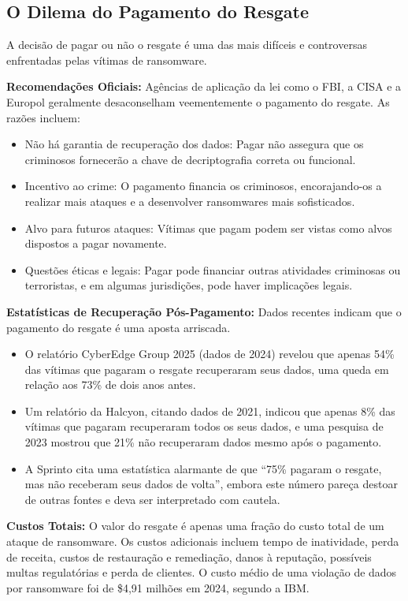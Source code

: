 \subsection{O Dilema do Pagamento do Resgate}
A decisão de pagar ou não o resgate é uma das mais difíceis e controversas enfrentadas pelas vítimas de ransomware.

\textbf{Recomendações Oficiais:} Agências de aplicação da lei como o FBI, a CISA e a Europol geralmente desaconselham veementemente o pagamento do resgate. As razões incluem:

\begin{itemize}
    \item Não há garantia de recuperação dos dados: Pagar não assegura que os criminosos fornecerão a chave de decriptografia correta ou funcional.
    \item Incentivo ao crime: O pagamento financia os criminosos, encorajando-os a realizar mais ataques e a desenvolver ransomwares mais sofisticados.
    \item Alvo para futuros ataques: Vítimas que pagam podem ser vistas como alvos dispostos a pagar novamente.
    \item Questões éticas e legais: Pagar pode financiar outras atividades criminosas ou terroristas, e em algumas jurisdições, pode haver implicações legais.
\end{itemize}

\textbf{Estatísticas de Recuperação Pós-Pagamento:} Dados recentes indicam que o pagamento do resgate é uma aposta arriscada.

\begin{itemize}
    \item O relatório CyberEdge Group 2025 (dados de 2024) revelou que apenas 54\% das vítimas que pagaram o resgate recuperaram seus dados, uma queda em relação aos 73\% de dois anos antes.
    \item Um relatório da Halcyon, citando dados de 2021, indicou que apenas 8\% das vítimas que pagaram recuperaram todos os seus dados, e uma pesquisa de 2023 mostrou que 21\% não recuperaram dados mesmo após o pagamento.
    \item A Sprinto cita uma estatística alarmante de que ``75\% pagaram o resgate, mas não receberam seus dados de volta'', embora este número pareça destoar de outras fontes e deva ser interpretado com cautela.
\end{itemize}

\textbf{Custos Totais:} O valor do resgate é apenas uma fração do custo total de um ataque de ransomware. Os custos adicionais incluem tempo de inatividade, perda de receita, custos de restauração e remediação, danos à reputação, possíveis multas regulatórias e perda de clientes. O custo médio de uma violação de dados por ransomware foi de \$4,91 milhões em 2024, segundo a IBM.

